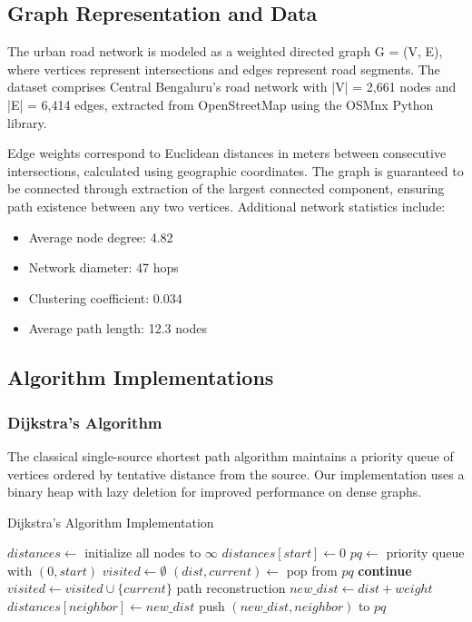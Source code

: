 \documentclass[conference]{IEEEtran}
\begin{document}
\subsection{Graph Representation and Data}

The urban road network is modeled as a weighted directed graph G = (V, E), where vertices represent intersections and edges represent road segments. The dataset comprises Central Bengaluru's road network with |V| = 2,661 nodes and |E| = 6,414 edges, extracted from OpenStreetMap using the OSMnx Python library.

Edge weights correspond to Euclidean distances in meters between consecutive intersections, calculated using geographic coordinates. The graph is guaranteed to be connected through extraction of the largest connected component, ensuring path existence between any two vertices. Additional network statistics include:

\begin{itemize}
\item Average node degree: 4.82
\item Network diameter: 47 hops
\item Clustering coefficient: 0.034
\item Average path length: 12.3 nodes
\end{itemize}

\subsection{Algorithm Implementations}

\subsubsection{Dijkstra's Algorithm}
The classical single-source shortest path algorithm maintains a priority queue of vertices ordered by tentative distance from the source. Our implementation uses a binary heap with lazy deletion for improved performance on dense graphs.

\begin{algorithm}
\caption{Dijkstra's Algorithm Implementation}
\begin{algorithmic}[1]
    \State $distances \gets$ initialize all nodes to $\infty$
    \State $distances[start] \gets 0$
    \State $pq \gets$ priority queue with $(0, start)$
    \State $visited \gets \emptyset$
        \State $(dist, current) \gets$ pop from $pq$
            \State \textbf{continue}
        \EndIf
        \State $visited \gets visited \cup \{current\}$
            \State \Return path reconstruction
        \EndIf
            \State $new\_dist \gets dist + weight$
                \State $distances[neighbor] \gets new\_dist$
                \State push $(new\_dist, neighbor)$ to $pq$
            \EndIf
        \EndForAll
    \EndWhile
\EndProcedure
\end{algorithmic}
\end{algorithm}
\end{document}
